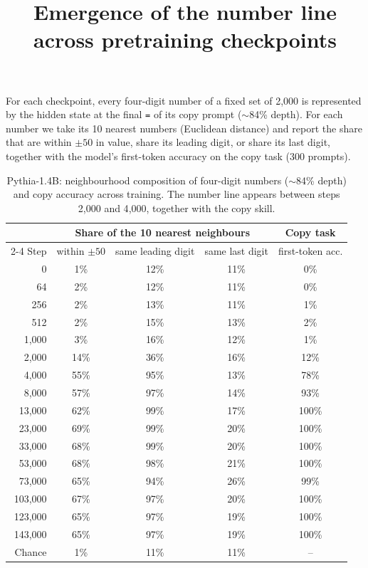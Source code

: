 \documentclass[11pt]{article}
\title{Emergence of the number line across pretraining checkpoints}
\author{}
\date{}
\begin{document}
\maketitle

\noindent For each checkpoint, every four-digit number of a fixed set of 2,000 is represented by the hidden state at
the final \texttt{=} of its copy prompt ($\sim$84\% depth). For each number we take its 10 nearest numbers
(Euclidean distance) and report the share that are within $\pm 50$ in value, share its leading digit, or share
its last digit, together with the model's first-token accuracy on the copy task (300 prompts).

\begin{table}[ht]
\centering
\small
\begin{tabular}{rcccc}
\toprule
 & \multicolumn{3}{c}{Share of the 10 nearest neighbours} & Copy task \\
\cmidrule(lr){2-4}
Step & within $\pm 50$ & same leading digit & same last digit & first-token acc. \\
\midrule
0 & 1\% & 12\% & 11\% & 0\% \\
64 & 2\% & 12\% & 11\% & 0\% \\
256 & 2\% & 13\% & 11\% & 1\% \\
512 & 2\% & 15\% & 13\% & 2\% \\
1{,}000 & 3\% & 16\% & 12\% & 1\% \\
2{,}000 & 14\% & 36\% & 16\% & 12\% \\
4{,}000 & 55\% & 95\% & 13\% & 78\% \\
8{,}000 & 57\% & 97\% & 14\% & 93\% \\
13{,}000 & 62\% & 99\% & 17\% & 100\% \\
23{,}000 & 69\% & 99\% & 20\% & 100\% \\
33{,}000 & 68\% & 99\% & 20\% & 100\% \\
53{,}000 & 68\% & 98\% & 21\% & 100\% \\
73{,}000 & 65\% & 94\% & 26\% & 99\% \\
103{,}000 & 67\% & 97\% & 20\% & 100\% \\
123{,}000 & 65\% & 97\% & 19\% & 100\% \\
143{,}000 & 65\% & 97\% & 19\% & 100\% \\
\midrule
Chance & 1\% & 11\% & 11\% & -- \\
\bottomrule
\end{tabular}
\caption{Pythia-1.4B: neighbourhood composition of four-digit numbers ($\sim$84\% depth) and copy accuracy across training. The number line appears between steps 2{,}000 and 4{,}000, together with the copy skill.}
\label{tab:numline_pythia}
\end{table}
\end{document}
